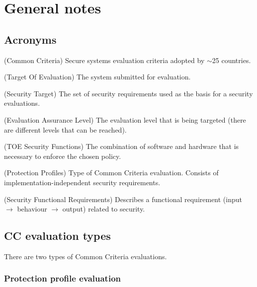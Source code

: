 \documentclass[10pt]{article}
\begin{document}
  \section{General notes}

    \subsection{Acronyms}

    \begin{description}[style=multiline,leftmargin=1.7cm]
      \item[CC]{
          (Common Criteria) Secure systems evaluation criteria adopted by
          $\sim$25 countries.
      }
      \item[TOE]{
          (Target Of Evaluation) The system submitted for evaluation.
      }
      \item[ST]{
          (Security Target) The set of security requirements used as the basis
          for a security evaluations.
      }
      \item[EAL]{
          (Evaluation Assurance Level) The evaluation level that is being
          targeted (there are different levels that can be reached).
      }
      \item[TSF]{
          (TOE Security Functions) The combination of software and hardware
          that is necessary to enforce the chosen policy.
      }
      \item[PP]{
          (Protection Profiles) Type of Common Criteria evaluation. Consists of
          implementation-independent security requirements.
      }
      \item[SFR]{
          (Security Functional Requirements) Describes a functional requirement
          (input $\rightarrow$ behaviour $\rightarrow$ output) related to
          security.
      }
    \end{description}

    \subsection{CC evaluation types}

      There are two types of Common Criteria evaluations.

      \subsubsection{Protection profile evaluation}
\end{document}
